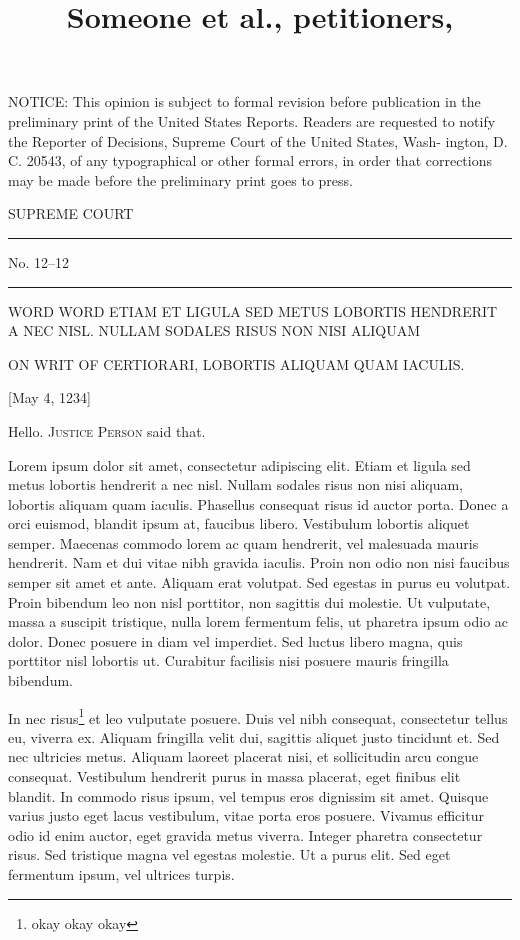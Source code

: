\documentclass[twoside]{article}
\title{Someone et al., petitioners, }
\begin{document}
  \scriptsize NOTICE: This opinion is subject to formal revision before
  publication in the preliminary print of the United States Reports.
  Readers are requested to notify the Reporter of Decisions, Supreme
  Court of the United States, Wash- ington, D. C. 20543, of any
  typographical or other formal errors, in order that corrections may
  be made before the preliminary print goes to press. \normalsize

\begin{center}

  \Large SUPREME COURT \normalsize

  \rule{2cm}{1pt}

  No. 12--12

  \rule{2cm}{1pt}

  WORD WORD  ETIAM ET LIGULA SED METUS LOBORTIS HENDRERIT A NEC NISL. NULLAM SODALES RISUS NON NISI ALIQUAM

  \vspace{1ex}

  ON WRIT OF CERTIORARI, LOBORTIS ALIQUAM QUAM IACULIS.

  \vspace{1ex}

  [May 4, 1234]

\end{center}


Hello. \textsc{Justice Person} said that.

Lorem ipsum dolor sit amet, consectetur adipiscing elit. Etiam et ligula sed metus lobortis hendrerit a nec nisl. Nullam sodales risus non nisi aliquam, lobortis aliquam quam iaculis. Phasellus consequat risus id auctor porta. Donec a orci euismod, blandit ipsum at, faucibus libero. Vestibulum lobortis aliquet semper. Maecenas commodo lorem ac quam hendrerit, vel malesuada mauris hendrerit. Nam et dui vitae nibh gravida iaculis. Proin non odio non nisi faucibus semper sit amet et ante. Aliquam erat volutpat. Sed egestas in purus eu volutpat. Proin bibendum leo non nisl porttitor, non sagittis dui molestie. Ut vulputate, massa a suscipit tristique, nulla lorem fermentum felis, ut pharetra ipsum odio ac dolor. Donec posuere in diam vel imperdiet. Sed luctus libero magna, quis porttitor nisl lobortis ut. Curabitur facilisis nisi posuere mauris fringilla bibendum.

In nec risus\footnote{okay okay okay}
et leo vulputate posuere. Duis vel nibh consequat, consectetur tellus eu, viverra ex. Aliquam fringilla velit dui, sagittis aliquet justo tincidunt et. Sed nec ultricies metus. Aliquam laoreet placerat nisi, et sollicitudin arcu congue consequat. Vestibulum hendrerit purus in massa placerat, eget finibus elit blandit. In commodo risus ipsum, vel tempus eros dignissim sit amet. Quisque varius justo eget lacus vestibulum, vitae porta eros posuere. Vivamus efficitur odio id enim auctor, eget gravida metus viverra. Integer pharetra consectetur risus. Sed tristique magna vel egestas molestie. Ut a purus elit. Sed eget fermentum ipsum, vel ultrices turpis.
\end{document}
